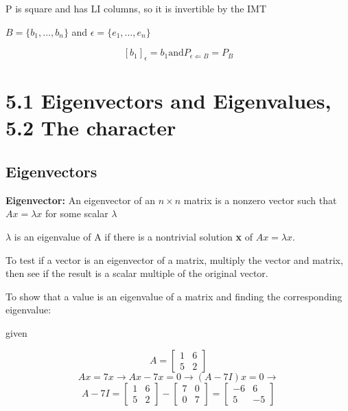  
\hfill

P is square and has LI columns, so it is invertible by the IMT

$B=\{b_{1},\ldots,b_{n}\}$ and $\epsilon=\{e_{1},\ldots,e_{n}\}$


\begin{equation}
	\label{}
	[b_{1}]_{\epsilon}=b_{1} \mbox{and} P_{\epsilon\Leftarrow B}=P_{B}
\end{equation}



\section{5.1 Eigenvectors and Eigenvalues, 5.2 The character}

\subsection{Eigenvectors}

		
\textbf{Eigenvector:} An eigenvector of an $n \times n$ matrix is a nonzero vector such that $Ax=\lambda x$ for some scalar $\lambda$

$\lambda$ is an eigenvalue of A if there is a nontrivial solution \textbf{x} of $Ax=\lambda x$.

\hfill

To test if a vector is an eigenvector of a matrix, multiply the vector and matrix, then see if the result is a scalar multiple of the original vector.

\hfill

To show that a value is an eigenvalue of a matrix and finding the corresponding eigenvalue:

given

\begin{equation}
	\label{}
	A=
\begin{bmatrix}
	1 &6\\5& 2	
\end{bmatrix}	
\end{equation}
\begin{equation}
	\label{}
Ax=7x\to Ax-7x=0 \to (A-7I)x=0 \to	
\end{equation}
\begin{equation}
	\label{}
A-7I=
\begin{bmatrix}
	1&6\\5&2	
\end{bmatrix}
-
\begin{bmatrix}
	7&0\\0&7	
\end{bmatrix}
=
\begin{bmatrix}
	-6&6\\5&-5	
\end{bmatrix}
\end{equation}

